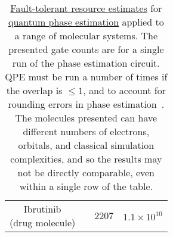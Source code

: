 \begin{refsection}
\begin{table}[!ht]
\begin{adjustbox}{max width=\textwidth}
\begin{tabular}{c|c|c|c}
        \makecell{Ibrutinib \\ (drug molecule)} &  \cite{blunt2022ChemistryDrugDiscovery} &  $2207$ & $ 1.1 \times 10^{10}$ 
    \end{tabular}
    \end{adjustbox}
    \caption{\hyperref[prim:FTQC]{Fault-tolerant resource estimates} for \hyperref[prim:QPE]{quantum phase estimation} applied to a range of molecular systems. The presented gate counts are for a single run of the phase estimation circuit. QPE must be run a number of times if the overlap is $\leq 1$, and to account for rounding errors in phase estimation~\cite{nielsen2002QCQI}. The molecules presented can have different numbers of electrons, orbitals, and classical simulation complexities, and so the results may not be directly comparable, even within a single row of the table.}
    \label{Tab:ResourceEst_MolecularElectronicStructure}
\end{table}



\end{refsection}
